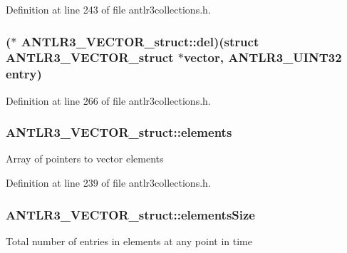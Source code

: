 Definition at line 243 of file antlr3collections.\-h.

\hypertarget{struct_a_n_t_l_r3___v_e_c_t_o_r__struct_a39648fceba2df70f8b75d75e7d586ae3}{
\subsubsection[{del}]{($\ast$ A\-N\-T\-L\-R3\-\_\-\-V\-E\-C\-T\-O\-R\-\_\-struct\-::del)(struct {\bf A\-N\-T\-L\-R3\-\_\-\-V\-E\-C\-T\-O\-R\-\_\-struct} $\ast${\bf vector}, {\bf A\-N\-T\-L\-R3\-\_\-\-U\-I\-N\-T32} entry)}}\label{struct_a_n_t_l_r3___v_e_c_t_o_r__struct_a39648fceba2df70f8b75d75e7d586ae3}


Definition at line 266 of file antlr3collections.\-h.

\hypertarget{struct_a_n_t_l_r3___v_e_c_t_o_r__struct_aa8e5e1c014f50572d08605b08c1ab7f0}{
\subsubsection[{elements}]{ A\-N\-T\-L\-R3\-\_\-\-V\-E\-C\-T\-O\-R\-\_\-struct\-::elements}}\label{struct_a_n_t_l_r3___v_e_c_t_o_r__struct_aa8e5e1c014f50572d08605b08c1ab7f0}
Array of pointers to vector elements 

Definition at line 239 of file antlr3collections.\-h.

\hypertarget{struct_a_n_t_l_r3___v_e_c_t_o_r__struct_ae138b005f2bcd128d9c78209839319b5}{
\subsubsection[{elements\-Size}]{ A\-N\-T\-L\-R3\-\_\-\-V\-E\-C\-T\-O\-R\-\_\-struct\-::elements\-Size}}\label{struct_a_n_t_l_r3___v_e_c_t_o_r__struct_ae138b005f2bcd128d9c78209839319b5}
Total number of entries in elements at any point in time 


